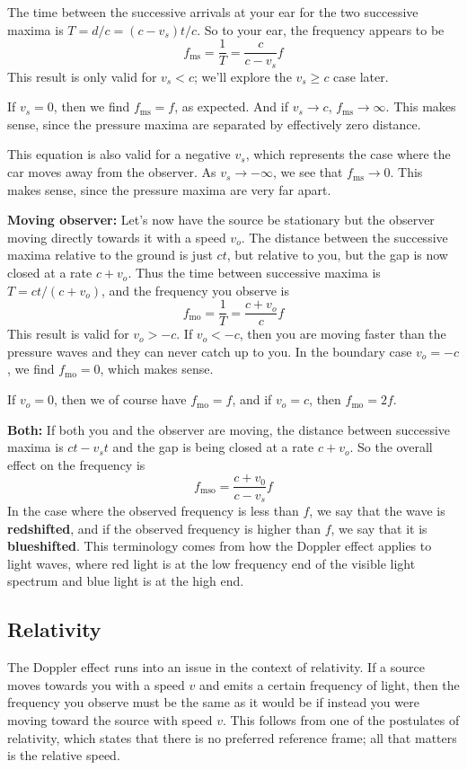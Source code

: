 The time between the successive arrivals at your ear for the two successive maxima is $T = d/c = (c - v_s)t/c$. So to your ear, the frequency appears to be
\[ f_\text{ms} = \frac{1}{T} = \frac{c}{c-v_s}f \]
This result is only valid for $v_s<c$; we'll explore the $v_s\ge c$ case later.

If $v_s=0$, then we find $f_\text{ms} = f$, as expected. And if $v_s\to c$, $f_\text{ms} \to \infty$. This makes sense, since the pressure maxima are separated by effectively zero distance. 

This equation is also valid for a negative $v_s$, which represents the case where the car moves away from the observer. As $v_s\to -\infty$, we see that $f_\text{ms} \to 0$. This makes sense, since the pressure maxima are very far apart.

\textbf{Moving observer:} Let's now have the source be stationary but the observer moving directly towards it with a speed $v_o$. The distance between the successive maxima relative to the ground is just $ct$, but relative to you, but the gap is now closed at a rate $c + v_o$. Thus the time between successive maxima is $T = ct/(c + v_o)$, and the frequency you observe is 
\[ f_\text{mo} = \frac{1}{T} = \frac{c+v_o}{c}f\]
This result is valid for $v_o > -c$. If $v_o<-c$, then you are moving faster than the pressure waves and they can never catch up to you. In the boundary case $v_o=-c$, we find $f_\text{mo}=0$, which makes sense. 

If $v_o=0$, then we of course have $f_\text{mo} = f$, and if $v_o=c$, then $f_\text{mo} = 2f$.

\textbf{Both:} If both you and the observer are moving, the distance between successive maxima is $ct - v_st$ and the gap is being closed at a rate $c + v_o$. So the overall effect on the frequency is
\[ f_\text{mso} = \frac{c+v_0}{c-v_s} f\]
In the case where the observed frequency is less than $f$, we say that the wave is \textbf{redshifted}, and if the observed frequency is higher than $f$, we say that it is \textbf{blueshifted}. This terminology comes from how the Doppler effect applies to light waves, where red light is at the low frequency end of the visible light spectrum and blue light is at the high end.
\subsection*{Relativity}
The Doppler effect runs into an issue in the context of relativity. If a source moves towards you with a speed $v$ and emits a certain frequency of light, then the frequency you observe must be the same as it would be if instead you were moving toward the source with speed $v$. This follows from one of the postulates of relativity, which states that there is no preferred reference frame; all that matters is the relative speed.

